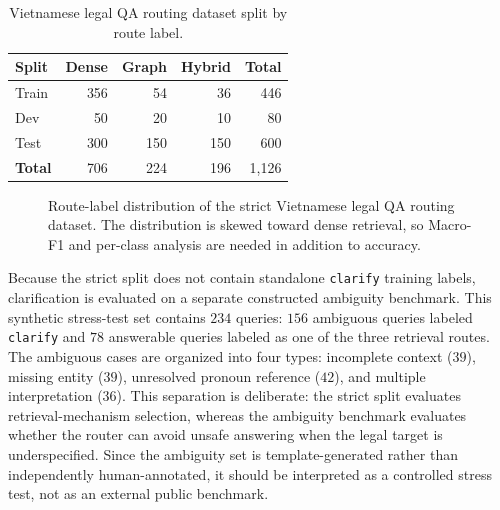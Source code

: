 \documentclass[11pt,twocolumn]{article}
\begin{document}
\begin{table}[!htbp]
\centering
\caption{Vietnamese legal QA routing dataset split by route label.}
\label{tab:dataset}
\small
\begin{tabular}{lrrrr}
\toprule
\textbf{Split} & \textbf{Dense} & \textbf{Graph} & \textbf{Hybrid} & \textbf{Total} \\
\midrule
Train & 356 & 54 & 36 & 446 \\
Dev & 50 & 20 & 10 & 80 \\
Test & 300 & 150 & 150 & 600 \\
\midrule
\textbf{Total} & 706 & 224 & 196 & 1,126 \\
\bottomrule
\end{tabular}
\end{table}

\begin{figure}[!htbp]
\centering
{}
\caption{Route-label distribution of the strict Vietnamese legal QA routing dataset. The distribution is skewed toward dense retrieval, so Macro-F1 and per-class analysis are needed in addition to accuracy.}
\label{fig:dataset_distribution}
\end{figure}

Because the strict split does not contain standalone
\texttt{clarify} training labels, clarification is evaluated
on a separate constructed ambiguity benchmark. This synthetic
stress-test set contains $234$ queries: $156$ ambiguous
queries labeled \texttt{clarify} and $78$ answerable queries
labeled as one of the three retrieval routes. The ambiguous
cases are organized into four types: incomplete context
($39$), missing entity ($39$), unresolved pronoun reference
($42$), and multiple interpretation ($36$). This separation is
deliberate: the strict split evaluates retrieval-mechanism
selection, whereas the ambiguity benchmark evaluates whether
the router can avoid unsafe answering when the legal target is
underspecified. Since the ambiguity set is template-generated
rather than independently human-annotated, it should be
interpreted as a controlled stress test, not as an external
public benchmark.
\end{document}
